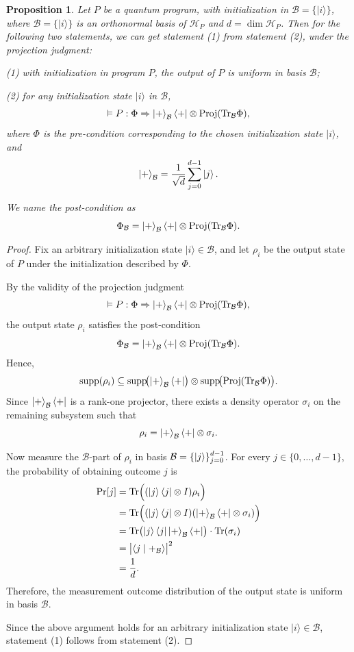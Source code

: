 \documentclass{report}
\theoremstyle{defn_style}
\newtheorem{pro}{Proposition}[section]
\begin{document}
\begin{pro}
Let $P$ be a quantum program, with initialization in $\mathcal{B}=\{|i\rangle\}$, where $\mathcal{B}=\{|i\rangle\}$ is an orthonormal basis of $\mathcal{H}_P$ and $d=\operatorname{dim} \mathcal{H}_P$. Then for the following two statements, we can get statement (1) from statement (2), under the projection judgment:

(1) with initialization in program $P$, the output of $ P $ is uniform in basis $\mathcal{B}$;

(2) for any initialization state $|i\rangle$ in $\mathcal{B}$,
$$
\vDash P: \Phi \Rightarrow \ket{+}_{\mathcal{B}}\bra{+}\otimes\text{Proj}(\text{Tr}_{\mathcal{B}}\Phi),
$$
where $\Phi$ is the pre-condition corresponding to the chosen initialization state $|i\rangle$, and
$$
\ket{+}_{\mathcal{B}}=\frac{1}{\sqrt d}\sum_{j=0}^{d-1}\ket{j}.
$$

We name the post-condition as
$$
\Phi_{\mathcal{B}}=\ket{+}_{\mathcal{B}}\bra{+}\otimes\text{Proj}(\text{Tr}_{\mathcal{B}}\Phi).
$$
\label{prop:Uniform2}
\end{pro}

\begin{proof}
Fix an arbitrary initialization state $|i\rangle\in\mathcal{B}$, and let $\rho_i$ be the output state of $P$ under the initialization described by $\Phi$.

By the validity of the projection judgment
$$
\vDash P: \Phi \Rightarrow \ket{+}_{\mathcal{B}}\bra{+}\otimes\text{Proj}(\text{Tr}_{\mathcal{B}}\Phi),
$$
the output state $\rho_i$ satisfies the post-condition
$$
\Phi_{\mathcal{B}}=\ket{+}_{\mathcal{B}}\bra{+}\otimes\text{Proj}(\text{Tr}_{\mathcal{B}}\Phi).
$$
Hence,
$$
\operatorname{supp}(\rho_i)\subseteq
\operatorname{supp}\!\bigl(\ket{+}_{\mathcal{B}}\bra{+}\bigr)\otimes
\operatorname{supp}\!\bigl(\text{Proj}(\text{Tr}_{\mathcal{B}}\Phi)\bigr).
$$
Since $\ket{+}_{\mathcal{B}}\bra{+}$ is a rank-one projector, there exists a density operator $\sigma_i$ on the remaining subsystem such that
$$
\rho_i=\ket{+}_{\mathcal{B}}\bra{+}\otimes\sigma_i.
$$

Now measure the $\mathcal{B}$-part of $\rho_i$ in basis $\mathcal{B}=\{\ket{j}\}_{j=0}^{d-1}$. For every $j\in\{0,\dots,d-1\}$, the probability of obtaining outcome $j$ is
\begin{align*}
\Pr[j]
&=\operatorname{Tr}\Bigl((\ket{j}\bra{j}\otimes I)\rho_i\Bigr)\\
&=\operatorname{Tr}\Bigl((\ket{j}\bra{j}\otimes I)(\ket{+}_{\mathcal{B}}\bra{+}\otimes\sigma_i)\Bigr)\\
&=\operatorname{Tr}\bigl(\ket{j}\bra{j}\ket{+}_{\mathcal{B}}\bra{+}\bigr)\cdot\operatorname{Tr}(\sigma_i)\\
&=\bigl|\langle j \mid +_{\mathcal{B}}\rangle\bigr|^2\\
&=\frac{1}{d}.
\end{align*}
Therefore, the measurement outcome distribution of the output state is uniform in basis $\mathcal{B}$.

Since the above argument holds for an arbitrary initialization state $|i\rangle\in\mathcal{B}$, statement (1) follows from statement (2).
\end{proof}
\end{document}
